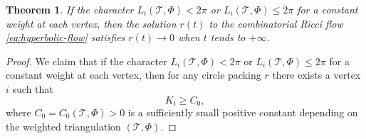 \documentclass[12pt]{amsart}
\numberwithin{equation}{section}
\newtheorem{theo}[prop]{Theorem}
\begin{document}
\begin{theo}\label{thm:7.3}
If the character $L_i(\mathcal{T},\Phi) < 2\pi$ or $L_i(\mathcal{T},\Phi) \leq 2\pi$ for a constant weight at each vertex,
then the solution $r(t)$ to the combinatorial Ricci flow \eqref{eq:hyperbolic-flow} satisfies $r(t) \to 0$ when $t$ tends to $+\infty$.
\end{theo}

\begin{proof}
We claim that if the character $L_i(\mathcal{T},\Phi) < 2\pi$ or $L_i(\mathcal{T},\Phi) \leq 2\pi$ for a constant weight at each
vertex, then for any circle packing $r$ there exists a vertex $i$ such that
\[
K_i \geq C_0,
\]
where $C_0 = C_0(\mathcal{T},\Phi) > 0$ is a sufficiently small positive constant depending on the weighted triangulation
$(\mathcal{T},\Phi)$.


\end{proof}
\end{document}

